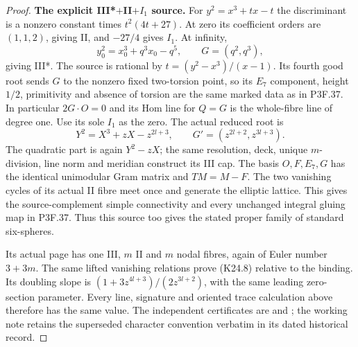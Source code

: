 \begin{proof}
\par\medskip\noindent\textbf{The explicit III*$+$II$+I_1$ source.}
For $y^2=x^3+tx-t$ the discriminant is a nonzero constant
times $t^2(4t+27)$. At zero its coefficient orders are
$(1,1,2)$, giving II, and $-27/4$ gives $I_1$. At infinity,
\[
 y_0^2=x_0^3+q^3x_0-q^5,\qquad G=(q^2,q^3),
\]
giving III*. The source is rational by
$t=(y^2-x^3)/(x-1)$. Its fourth good root sends $G$ to the
nonzero fixed two-torsion point, so its $E_7$ component,
height $1/2$, primitivity and absence of torsion are the same
marked data as in P3F.37. In particular $2G\cdot O=0$ and
its Hom line for $Q=G$ is the whole-fibre line of degree one.
Use its sole $I_1$ as the zero. The actual reduced root is
\[
 Y^2=X^3+zX-z^{2l+3},\qquad
 G'=(z^{2l+2},z^{3l+3}).
\]
The quadratic part is again $Y^2-zX$; the same resolution,
deck, unique $m$-division, line norm and meridian construct its
III cap. The basis $O,F,E_7,G$ has the identical unimodular
Gram matrix and $TM=M-F$. The two vanishing cycles of its
actual II fibre meet once and generate the elliptic lattice.
This gives the source-complement simple connectivity and every
unchanged integral gluing map in P3F.37. Thus this source too
gives the stated proper family of standard six-spheres.

Its actual page has one III, $m$ II and $m$ nodal fibres,
again of Euler number $3+3m$. The same lifted vanishing
relations prove (K24.8) relative to the binding. Its doubling
slope is $(1+3z^{4l+3})/(2z^{3l+2})$, with the same leading
zero-section parameter. Every line, signature and oriented
trace calculation above therefore has the same value. The
independent certificates are
 and
; the working
note retains the superseded character convention verbatim in
its dated historical record.
\end{proof}
